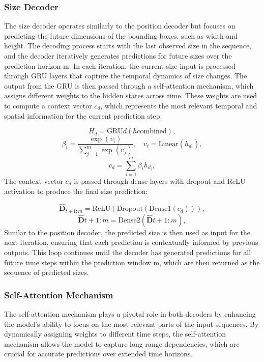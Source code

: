 \documentclass[12pt,oneside]{book} %
\begin{document}
\subsubsection*{Size Decoder}
\noindent The size decoder operates similarly to the position decoder but focuses on
predicting the future dimensions of the bounding boxes, such as width and
height. The decoding process starts with the last observed size in the
sequence, and the decoder iteratively generates predictions for future sizes
over the prediction horizon m. In each iteration, the current size input is processed through GRU layers that
capture the temporal dynamics of size changes. The output from the GRU is then
passed through a self-attention mechanism, which assigns different weights to
the hidden states across time. These weights are used to compute a context
vector $c_d$, which represents the most relevant temporal and spatial
information for the current prediction step.

\begin{equation}
    H_d = \text{GRU}d(h{\text{combined}}),
\end{equation}
\begin{equation}
    \beta_i = \frac{\exp(v_i)}{\sum_{j=1}^{m}\exp(v_j)}, \quad v_i = \text{Linear}(h_{d_i}),
\end{equation}
\begin{equation}
    c_d = \sum_{i=1}^{m} \beta_i h_{d_i},
\end{equation}
The context vector $c_d$ is passed through dense layers with dropout and ReLU
activation to produce the final size prediction:

\begin{equation}
    \hat{\mathbf{D}}_{t+1:m} = \text{ReLU}(\text{Dropout}(\text{Dense}1(c_d))),
\end{equation}
\begin{equation}
    \hat{\mathbf{D}}{t+1:m} = \text{Dense}2(\hat{\mathbf{D}}{t+1:m}),
\end{equation}
Similar to the position decoder, the predicted size is then used as input for
the next iteration, ensuring that each prediction is contextually informed by
previous outputs. This loop continues until the decoder has generated
predictions for all future time steps within the prediction window m, which are
then returned as the sequence of predicted sizes.

\subsubsection*{Self-Attention Mechanism}
\noindent The self-attention mechanism plays a pivotal role in both decoders by enhancing
the model’s ability to focus on the most relevant parts of the input sequences.
By dynamically assigning weights to different time steps, the self-attention
mechanism allows the model to capture long-range dependencies, which are
crucial for accurate predictions over extended time horizons.
\end{document}
